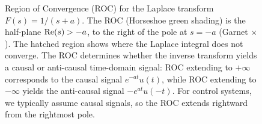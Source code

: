 \begin{figure}[htbp]

\caption{Region of Convergence (ROC) for the Laplace transform $F(s) = 1/(s+a)$. The ROC (Horseshoe green shading) is the half-plane $\operatorname{Re}(s) > -a$, to the right of the pole at $s = -a$ (Garnet $\times$). The hatched region shows where the Laplace integral does not converge. The ROC determines whether the inverse transform yields a causal or anti-causal time-domain signal: ROC extending to $+\infty$ corresponds to the causal signal $e^{-at}u(t)$, while ROC extending to $-\infty$ yields the anti-causal signal $-e^{at}u(-t)$. For control systems, we typically assume causal signals, so the ROC extends rightward from the rightmost pole.}
\label{fig:region_of_convergence}
\end{figure}
